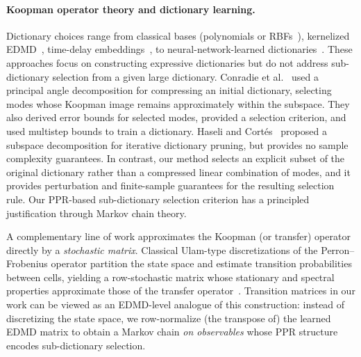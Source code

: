 \documentclass{article}
\theoremstyle{plain}
\theoremstyle{definition}
\newcommand{\arXivtag}[1][]{#1}
\begin{document}
	\paragraph{Koopman operator theory and dictionary learning.}
	Dictionary choices range from classical bases (polynomials or RBFs~\cite{williams2015data}), kernelized EDMD~\cite{williams2015data, kawahara2016dynamic}, time-delay embeddings~\cite{arbabi2017ergodic}, to neural-network-learned dictionaries~\cite{alford2022deep, takeishi2017learning, li2017extended, wehmeyer2018time, meng2024Koopman, yeung2019learning}. These approaches focus on constructing expressive dictionaries but do not address sub-dictionary selection from a given large dictionary. Conradie et al.~\cite{conradie2026trustworthy} used a principal angle decomposition for compressing an initial dictionary, selecting modes whose Koopman image remains approximately within the subspace. They also derived error bounds for selected modes, provided a selection criterion, and used multistep bounds to train a dictionary. Haseli and Cort\'{e}s~\cite{haseli2021learning, haseli2023generalizing} proposed a subspace decomposition for iterative dictionary pruning, but provides no sample complexity guarantees. In contrast, our method selects an explicit subset of the original dictionary rather than a compressed linear combination of modes, and it provides perturbation and finite-sample guarantees for the resulting selection rule. Our PPR-based sub-dictionary selection criterion has a principled justification through Markov chain theory.
	
	A complementary line of work approximates the Koopman (or transfer) operator directly by a \emph{stochastic matrix}. Classical Ulam-type discretizations of the Perron--Frobenius operator partition the state space and estimate transition probabilities between cells, yielding a row-stochastic matrix whose stationary and spectral properties approximate those of the transfer operator~\cite{ulam2004problems, LI1976177, Klus2016JCompDyn}. Transition matrices in our work can be viewed as an EDMD-level analogue of this construction: instead of discretizing the state space, we row-normalize (the transpose of) the learned \arXivtag[EDMD] matrix to obtain a Markov chain \emph{on observables} whose PPR structure encodes sub-dictionary selection.
	
\end{document}

